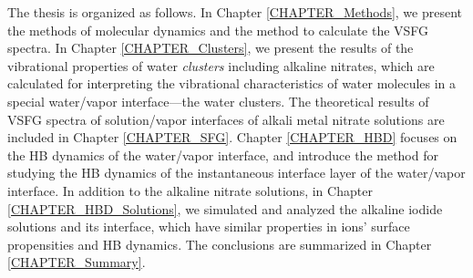
The thesis is organized as follows. 
In Chapter \ref{CHAPTER_Methods}, we present the methods of \abinitio molecular dynamics
and the method to calculate the VSFG spectra.
In Chapter \ref{CHAPTER_Clusters}, we present the results of the vibrational properties of water \emph{clusters} including alkaline nitrates, 
which are calculated for interpreting the vibrational characteristics of water molecules in a special water/vapor interface---the water clusters.
The theoretical results of VSFG spectra of solution/vapor interfaces of alkali metal nitrate solutions are included in Chapter \ref{CHAPTER_SFG}. 
Chapter \ref{CHAPTER_HBD} focuses on the HB dynamics of the water/vapor interface, 
and introduce the method for studying the HB dynamics of the instantaneous interface layer of the water/vapor interface.
In addition to the alkaline nitrate solutions, in Chapter \ref{CHAPTER_HBD_Solutions}, we simulated and analyzed the alkaline iodide solutions and its interface, which have similar properties in ions' surface propensities and HB dynamics. 
The conclusions are summarized in Chapter \ref{CHAPTER_Summary}.
